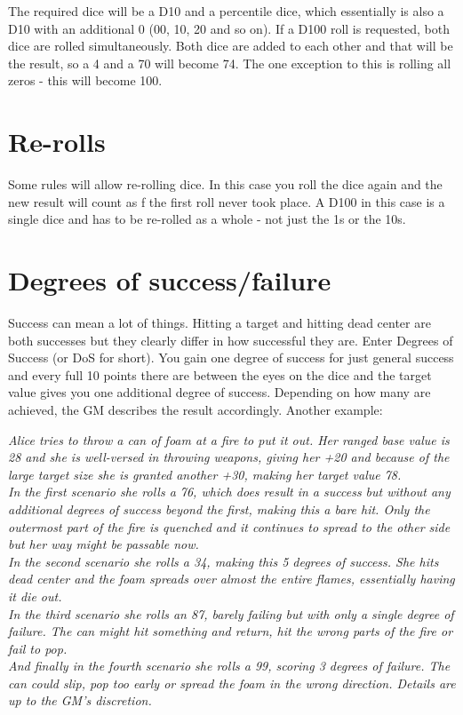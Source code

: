 \documentclass[12pt,a4paper,openany]{book}
\begin{document}
	The required dice will be a D10 and a percentile dice, which essentially is also a D10 with an additional 0 (00, 10, 20 and so on). If a D100 roll is requested, both dice are rolled simultaneously. Both dice are added to each other and that will be the result, so a 4 and a 70 will become 74. The one exception to this is rolling all zeros - this will become 100.
	\section{Re-rolls}
	Some rules will allow re-rolling dice. In this case you roll the dice again and the new result will count as f the first roll never took place. A D100 in this case is a single dice and has to be re-rolled as a whole - not just the 1s or the 10s.
	\section{Degrees of success/failure}
	Success can mean a lot of things. Hitting a target and hitting dead center are both successes but they clearly differ in how successful they are. Enter Degrees of Success (or DoS for short). You gain one degree of success for just general success and every full 10 points there are between the eyes on the dice and the target value gives you one additional degree of success. Depending on how many are achieved, the GM describes the result accordingly.
	Another example:

	\begin{exampleblock}\textit{
	Alice tries to throw a can of foam at a fire to put it out. Her ranged base value is 28 and she is well-versed in throwing weapons, giving her +20 and because of the large target size she is granted another +30, making her target value 78.\\
	In the first scenario she rolls a 76, which does result in a success but without any additional degrees of success beyond the first, making this a bare hit. Only the outermost part of the fire is quenched and it continues to spread to the other side but her way might be passable now.\\
	In the second scenario she rolls a 34, making this 5 degrees of success. She hits dead center and the foam spreads over almost the entire flames, essentially having it die out.\\
	In the third scenario she rolls an 87, barely failing but with only a single degree of failure. The can might hit something and return, hit the wrong parts of the fire or fail to pop.\\
	And finally in the fourth scenario she rolls a 99, scoring 3 degrees of failure. The can could slip, pop too early or spread the foam in the wrong direction. Details are up to the GM's discretion.
		}
	\end{exampleblock}
\end{document}
